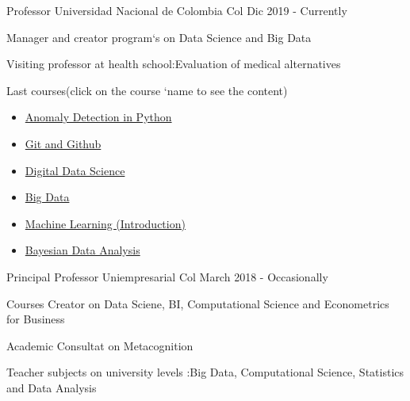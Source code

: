 

\begin{cventries}

\cventry
    {Professor}
    {Universidad Nacional de Colombia}
    {Col}
    {Dic 2019 - Currently}
    {
    \begin{cvitems}
    \item {Manager and creator program`s on Data Science and Big Data}
    \item {Visiting professor at health school:Evaluation of medical alternatives}
    \item {Last courses(click on the course `name  to see the content)}
    \begin{itemize}
    \item {\textcolor{brown}{\href{https://github.com/carlosjimenez88M/Github-Class/tree/master}{Anomaly Detection in Python}}}
        \item {\textcolor{brown}{\href{https://github.com/carlosjimenez88M/Github-Class/tree/master}{Git and Github}}}
        \item {\textcolor{brown}{\href{https://github.com/carlosjimenez88M/Marketing_Digital}{Digital Data Science}}}
        \item {\textcolor{brown}{\href{https://github.com/carlosjimenez88M/Curso-de-Big-Data-e-Ingenieria-de-datos}{Big Data}}}
        \item {\textcolor{brown}{\href{https://github.com/carlosjimenez88M/Machine_Learning}{Machine Learning (Introduction)}}}
        \item {\textcolor{brown}{\href{https://github.com/carlosjimenez88M/Curso-de-Big-Data-e-Ingenieria-de-datos}{Bayesian Data Analysis}}}
    \end{itemize}
    \end{cvitems}
    }
 




  \cventry
    {Principal Professor } %
    {Uniempresarial} %
    {Col} %
    {March 2018 - Occasionally} %
    {
      \begin{cvitems} %
        \item {Courses Creator on Data Sciene, BI, Computational Science and Econometrics for Business}
        \item {Academic Consultat on Metacognition }
        \item {Teacher  subjects on university levels :Big Data, Computational Science, Statistics and Data Analysis}
      \end{cvitems}
    }


\end{cventries}

